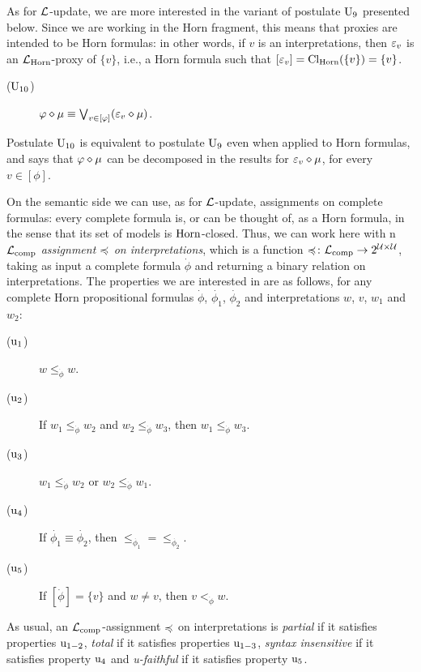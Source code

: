 As for $\mathcal{L}$-update, we are more interested in the variant of postulate
$\mathrm{U}_{9}$ presented below.
Since we are working in the Horn fragment, 
this means that proxies are intended to be Horn formulas:
in other words, if $v$ is an interpretations, then 
$\varepsilon_{v}$ is an $\mathcal{L}_{\mathrm{Horn}}$-proxy of $\{v\}$,
i.e., a Horn formula such that $[\varepsilon_{v}]={\operatorname{Cl}}_{\mathrm{Horn}}(\{v\})=\{v\}$.

\begin{description}
	\item[($\mathrm{U}_{10}$)] $\varphi\diamond\mu\equiv \bigvee_{v\in[\varphi]}(\varepsilon_{v}\diamond\mu)$.
\end{description}

Postulate $\mathrm{U}_{10}$ is equivalent to postulate $\mathrm{U}_{9}$ 
even when applied to Horn formulas, 
and says that $\varphi\diamond\mu$ can be decomposed
in the results for $\varepsilon_{v}\diamond\mu$, for every $v\in[\phi]$.

On the semantic side we can use, as for $\mathcal{L}$-update, 
assignments on complete formulas: every complete formula is,
or can be thought of, as a Horn formula, 
in the sense that its set of models is $\mathrm{Horn}$-closed.
Thus, we can work here with n \emph{$\mathcal{L}_{{\operatorname{comp}}}$ assignment $\preccurlyeq$ on interpretations}, 
which is a function $\preccurlyeq\colon\mathcal{L}_{{\operatorname{comp}}}\rightarrow 2^{\mathcal{U}\times\mathcal{U}}$,
taking as input a complete formula $\dot{\phi}$ and returning
a binary relation on interpretations.
The properties we are interested in are as follows, 
for any complete Horn propositional formulas $\dot{\phi}$, $\dot{\phi_{1}}$, $\dot{\phi_{2}}$
and interpretations $w$, $v$, $w_1$ and $w_2$:

\begin{description}
	\item[($\mathrm{u}_{1}$)] $w\le_{\dot{\phi}} w$.
	\item[($\mathrm{u}_{2}$)] If $w_1\le_{\dot{\phi}} w_2$ and $w_2\le_{\dot{\phi}} w_3$, 
		then $w_1\le_{\dot{\phi}} w_3$.
	\item[($\mathrm{u}_{3}$)] $w_1\le_{\dot{\phi}} w_2$ or $w_2\le_{\dot{\phi}} w_1$.
	\item[($\mathrm{u}_{4}$)] If $\dot{\phi_1}\equiv \dot{\phi_2}$, then $\le_{\dot{\phi_1}} = \le_{\dot{\phi_2}}$. 
	\item[($\mathrm{u}_{5}$)] If $[\dot{\phi}]=\{v\}$ and $w\neq v$, then $v<_{\dot{\phi}} w$.
\end{description}

As usual, an $\mathcal{L}_{{\operatorname{comp}}}$-assignment $\preccurlyeq$ on interpretations is 
\emph{partial} if it satisfies properties $\mathrm{u}_{1-2}$,
\emph{total} if it satisfies properties $\mathrm{u}_{1-3}$,
\emph{syntax insensitive} if it satisfies property $\mathrm{u}_{4}$
and \emph{u-faithful} if it satisfies property $\mathrm{u}_{5}$.

